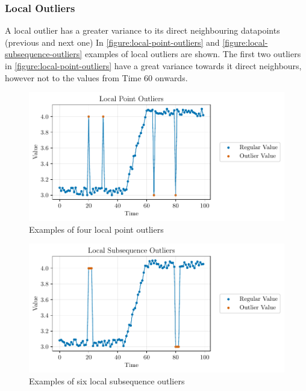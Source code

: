 \subsubsection{Local Outliers}
A local outlier has a greater variance to its direct neighbouring datapoints (previous and next one) \cite{blazquez-garciaReviewOutlierAnomaly2020} In \autoref{figure:local-point-outliers} and \autoref{figure:local-subsequence-outliers} examples of local outliers are shown. The first two outliers in \autoref{figure:local-point-outliers} have a great variance towards it direct neighbours, however not to the values from Time 60 onwards.
\begin{figure}[H]
  \centering
  \includegraphics{./plots/pdfs/local_point_outliers.pdf}
  \caption{Examples of four local point outliers}
  \label{figure:local-point-outliers}
\end{figure}
\begin{figure}[H]
  \centering
  \includegraphics{./plots/pdfs/local_subsequence_outliers.pdf}
  \caption{Examples of six local subsequence outliers}
  \label{figure:local-subsequence-outliers}
\end{figure}
